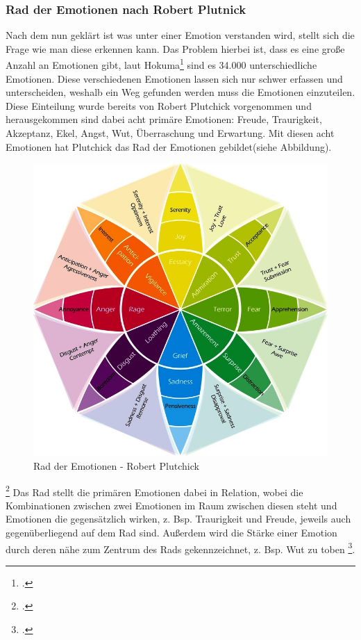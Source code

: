 \subsubsection{Rad der Emotionen nach Robert Plutnick}
Nach dem nun geklärt ist was unter einer Emotion verstanden wird, stellt sich die Frage wie man diese erkennen kann. Das Problem hierbei ist, dass es eine große Anzahl an Emotionen gibt, laut Hokuma\footcite[Vgl.][Absch. 1]{Hok17} sind es 34.000 unterschiedliche Emotionen. Diese verschiedenen Emotionen lassen sich nur schwer erfassen und unterscheiden, weshalb ein Weg gefunden werden muss die Emotionen einzuteilen. Diese Einteilung wurde bereits von Robert Plutchick vorgenommen und herausgekommen sind dabei acht primäre Emotionen: Freude, Traurigkeit, Akzeptanz, Ekel, Angst, Wut, Überraschung und Erwartung.\newline
Mit diesen acht Emotionen hat Plutchick das Rad der Emotionen gebildet(siehe Abbildung).
\begin{figure}[h]
	\centering
	\includegraphics[width=16cm]{Bilder/wheel-of-emotions.png}
	\caption[Rad der Emotionen - Robert Plutchick]{Rad der Emotionen - Robert Plutchick\footnotemark}
\end{figure}%
\footcitetext[Vgl.][]{Hok17}
\newline
Das Rad stellt die primären Emotionen dabei in Relation, wobei die Kombinationen zwischen zwei Emotionen im Raum zwischen diesen steht und Emotionen die gegensätzlich wirken, z. Bsp. Traurigkeit und Freude, jeweils auch gegenüberliegend auf dem Rad sind. Außerdem wird die Stärke einer Emotion durch deren nähe zum Zentrum des Rads gekennzeichnet, z. Bsp. Wut zu toben \footcite[Vgl.][Absch. Elements of the Wheel]{Hok17}.\newline
